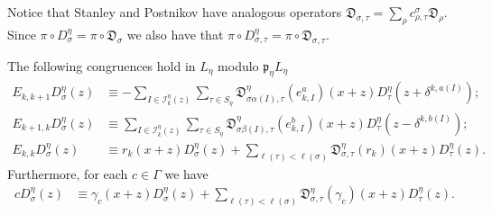 \documentclass[11pt,fleqn]{article}
\newcommand\DD{\mathfrak D}
\newcommand\I{\mathcal I}
\newcommand\p{\mathfrak p}
\begin{document}
Notice that Stanley and Postnikov have analogous operators $\DD_{\sigma,\tau}
= \sum_{\rho} c_{\rho, \tau}^\sigma \DD_\rho$. Since $\pi \circ D_\sigma^\eta 
= \pi \circ \DD_\sigma$ we also have that $\pi \circ D_{\sigma,\tau}^\eta 
= \pi \circ \DD_{\sigma, \tau}$.

\begin{Proposition}
\label{P:module-congruence}
The following congruences hold in $L_\eta$ modulo $\p_\eta L_\eta$
\begin{align*}
E_{k,k+1} D_\sigma^\eta(z)
	&\equiv - \sum_{I \in \I_k^\eta(z)}
	\sum_{\tau \in S_\eta}
	\DD^\eta_{\sigma\alpha(I),\tau}
		\left(
			e_{k,I}^a
		\right)(x+z) D_\tau^\eta(z+\delta^{k,a(I)}); \\
E_{k+1,k} D_\sigma^\eta(z)
	&\equiv \sum_{I \in \I_k^\eta(z)} 
		\sum_{\tau \in S_\eta} 
		\DD_{\sigma\beta(I),\tau}^\eta \left(e_{k,I}^b \right)
		(x+z) D_\tau^\eta(z - \delta^{k,b(I)});\\
E_{k,k} D_\sigma^\eta(z)
	&\equiv r_k(x+z) D_\sigma^\eta(z) +
		\sum_{\ell(\tau) < \ell(\sigma)} 
		\DD_{\sigma, \tau}^\eta(r_k)(x+z) 
			D_\tau^\eta(z).
\end{align*}
Furthermore, for each $c \in \Gamma$ we have
\begin{align*}
c D_\sigma^\eta(z)
	&\equiv \gamma_c(x+z) D_\sigma^\eta(z) +
		\sum_{\ell(\tau) < \ell(\sigma)} 
			\DD_{\sigma, \tau}^\eta(\gamma_c)(x+z) 
			D_\tau^\eta(z).
\end{align*}
\end{Proposition}
\end{document}

